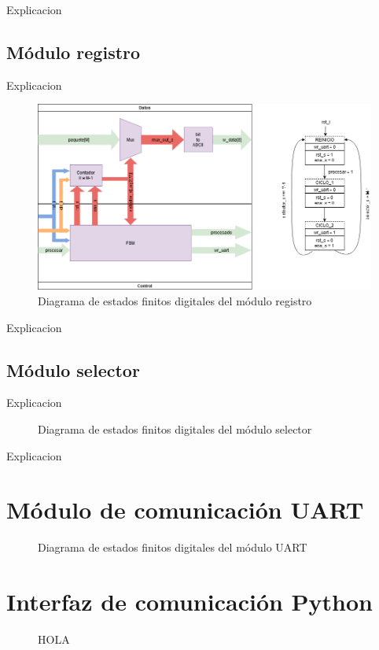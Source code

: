 		Explicacion 
		
	\subsection{Módulo registro}
	
		Explicacion 
		
		\begin{figure}[h]
		\centering
			\includegraphics[scale=.3]{./Figures/FSMD-Registro}
			\caption{Diagrama de estados finitos digitales del módulo registro}
			\label{fig:FSMD_Registro}
		\end{figure}

		Explicacion 
		
	\subsection{Módulo selector}
	
		Explicacion 
		
		\begin{figure}[h]
		\centering
			\caption{Diagrama de estados finitos digitales del módulo selector}
			\label{fig:FSMD_Selector}
		\end{figure}
		
		Explicacion 
		
\section{Módulo de comunicación UART}

		\begin{figure}[h]
		\centering
			\caption{Diagrama de estados finitos digitales del módulo UART}
			\label{fig:FSMD_UART}
		\end{figure}

\section{Interfaz de comunicación Python}

		\begin{figure}[h]
		\centering
			\caption{HOLA}
			\label{fig:hola}
		\end{figure}
